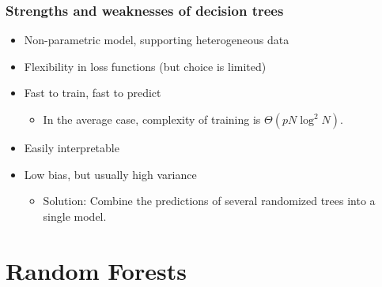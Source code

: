 \documentclass{beamer}
\begin{document}
\begin{frame}
  \frametitle{Strengths and weaknesses of decision trees}

  \begin{itemize}
    \item {\color{blue} Non-parametric} model, supporting {\color{blue} heterogeneous} data

    \vspace{0.25cm}

    \item {\color{blue}Flexibility} in loss functions (but choice is {\color{red}limited})

    \vspace{0.25cm}

    \item {\color{blue} Fast} to train, {\color{blue} fast} to predict
        \begin{itemize}
            \item In the average case, complexity of training is $\Theta(pN\log^2 N)$.
        \end{itemize}

    \vspace{0.25cm}

    \item Easily {\color{blue} interpretable}

    \vspace{0.25cm}

    \item {\color{blue} Low bias}, but usually {\color{red} high variance}\\
        \begin{itemize}
            \item Solution: Combine the predictions of several randomized trees into a single model.
        \end{itemize}
  \end{itemize}
\end{frame}



\section{Random Forests}
\end{document}
